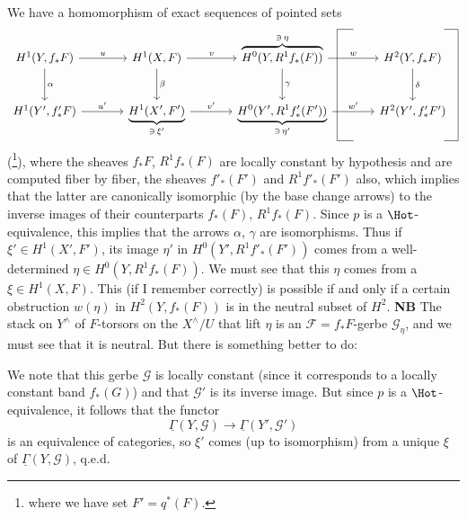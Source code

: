 \noindent We have a homomorphism of exact sequences of pointed sets
\[
\begin{tikzcd}[column sep=large, row sep=large,
  every matrix/.append style={name=m},
  execute at end picture={
    \coordinate (lb) at ([xshift=0.4em]m-2-3.east);
    \coordinate (lt) at ([xshift=1.8em]m-2-3.east);
    \draw (lt |- m-1-3.north) -- (lb |- m-1-3.north) -- (lb |- m-2-3.south) -- (lt |- m-2-3.south);
    \coordinate (rb) at ([xshift=0.6em]m-2-4.east);
    \coordinate (rt) at ([xshift=-0.6em]m-2-4.east);
    \draw (rt |- m-1-3.north) -- (rb |- m-1-3.north) -- (rb |- m-2-3.south) -- (rt |- m-2-3.south);
  }]
H^1(Y, f_*F) \arrow[r, "u"] \arrow[d, "\alpha"] & H^1(X,F) \arrow[r, "v"] \arrow[d, "\beta"] & \overbrace{H^0(Y, R^1 f_*(F))}^{\ni\, \eta} \arrow[r, "w"] \arrow[d, "\gamma"] & H^2(Y, f_*F) \arrow[d, "\delta"] \\
H^1(Y', f'_*F) \arrow[r, "u'"] & \underbrace{H^1(X', F')}_{\ni\, \xi'} \arrow[r, "v'"] & \underbrace{H^0(Y', R^1 f'_*(F'))}_{\ni\, \eta'} \arrow[r, "w'"] & H^2(Y', f'_*F') %
\end{tikzcd}
\]
(\footnote{where we have set $F' = q^*(F)$.}), where the sheaves $f_*F$, $R^1 f_*(F)$ are locally constant by hypothesis and are computed fiber by fiber, the sheaves $f'_*(F')$ and $R^1 f'_*(F')$ also, which implies that the latter are
canonically isomorphic (by the base change arrows) to the inverse images of their counterparts $f_*(F)$, $R^1 f_*(F)$. Since $p$ is a $\Hot$-equivalence, this implies that the arrows $\alpha$, $\gamma$ are isomorphisms. Thus if $\xi' \in H^1(X', F')$, its image $\eta'$ in $H^0(Y', R^1 f'_*(F'))$ comes from a well-determined $\eta \in H^0(Y, R^1 f_*(F))$. We must see that this $\eta$ comes from a $\xi \in H^1(X,F)$. This (if I remember correctly) is possible if and only if a certain obstruction $w(\eta)$ in $H^2(Y, f_*(F))$ is in the neutral subset of $H^2$. \textbf{NB} The stack on $Y^\wedge$ of $F$-torsors on the $X^\wedge/U$ that lift $\eta$ is an $\mathcal{F} = f_*F$-gerbe $\mathcal{G}_\eta$, and we must see that it is neutral. But there is something better to do:



\noindent We note that this gerbe $\mathcal{G}$ is locally constant (since it corresponds to a locally constant band $f_*(G)$) and that $\mathcal{G}'$ is its inverse image. But since $p$ is a $\Hot$-equivalence, it follows that the functor
\[
\underline{\Gamma}(Y, \mathcal{G}) \longrightarrow \underline{\Gamma}(Y', \mathcal{G}')
\]
is an equivalence of categories, so $\xi'$ comes (up to isomorphism) from a unique $\xi$ of $\underline{\Gamma}(Y, \mathcal{G})$, q.e.d.

